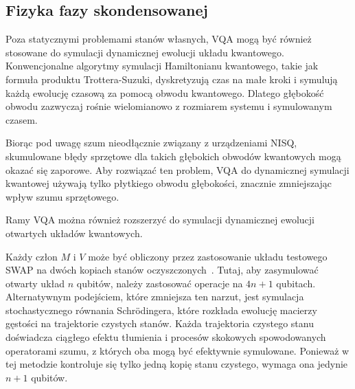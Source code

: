 \documentclass[a4paper,11pt]{article}
\begin{document}
\subsection{Fizyka fazy skondensowanej}

Poza statycznymi problemami stanów własnych, VQA mogą być również stosowane do symulacji dynamicznej ewolucji układu kwantowego. Konwencjonalne algorytmy symulacji Hamiltonianu kwantowego, takie jak formuła produktu Trottera-Suzuki,  dyskretyzują czas na małe kroki i symulują każdą ewolucję czasową za pomocą obwodu kwantowego. Dlatego głębokość obwodu zazwyczaj rośnie wielomianowo z rozmiarem systemu i symulowanym czasem.

Biorąc pod uwagę szum nieodłącznie związany z urządzeniami NISQ, skumulowane błędy sprzętowe dla takich głębokich obwodów kwantowych mogą okazać się zaporowe. Aby rozwiązać ten problem, VQA do dynamicznej symulacji kwantowej używają tylko płytkiego obwodu głębokości, znacznie zmniejszając wpływ szumu sprzętowego.


Ramy VQA można również rozszerzyć do symulacji dynamicznej ewolucji otwartych układów kwantowych. 
 
 
 
%


Każdy człon $M$ i $V$ może być obliczony przez zastosowanie układu testowego 
SWAP na dwóch kopiach stanów oczyszczonych~. Tutaj, aby zasymulować otwarty układ $n$ qubitów, należy zastosować operacje na $4n+1$ qubitach. Alternatywnym podejściem, które zmniejsza ten narzut, jest symulacja stochastycznego równania Schr\"odingera, które rozkłada ewolucję macierzy gęstości na trajektorie czystych stanów. Każda trajektoria czystego stanu doświadcza ciągłego efektu tłumienia i procesów skokowych spowodowanych operatorami szumu, z których oba mogą być efektywnie symulowane. Ponieważ w tej metodzie kontroluje się tylko jedną kopię stanu czystego, wymaga ona jedynie $n+1$ qubitów. 
\end{document}
